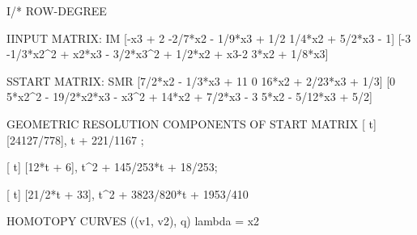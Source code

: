 I/* ROW-DEGREE


IINPUT MATRIX: IM [-x3 + 2  -2/7*x2 - 1/9*x3 + 1/2                          1/4*x2 + 5/2*x3 - 1]
                 [-3       -1/3*x2^2 + x2*x3 - 3/2*x3^2 + 1/2*x2 + x3-2    3*x2 + 1/8*x3]


SSTART MATRIX: SMR [7/2*x2 - 1/3*x3 + 11      0       16*x2 + 2/23*x3 + 1/3]
                  [0 		5*x2^2 - 19/2*x2*x3 - x3^2 + 14*x2 + 7/2*x3 - 3   5*x2 - 5/12*x3 + 5/2]


GEOMETRIC RESOLUTION COMPONENTS OF START MATRIX
[        t]              
[24127/778], t + 221/1167 ; 

[       t]                          
[12*t + 6], t^2 + 145/253*t + 18/253; 


[          t]                             
[21/2*t + 33], t^2 + 3823/820*t + 1953/410


HOMOTOPY CURVES ((v1, v2), q) lambda = x2

